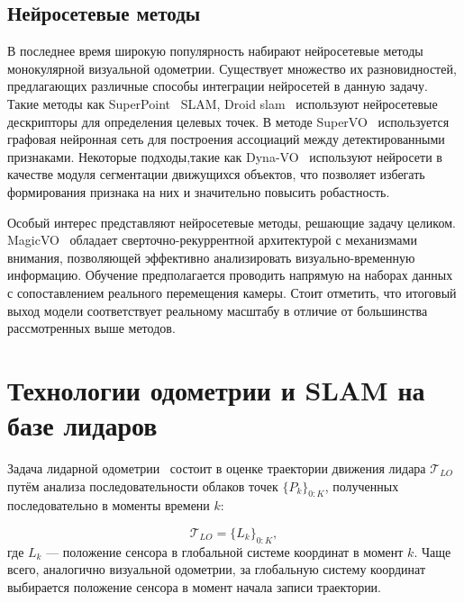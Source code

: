 \subsection{Нейросетевые методы}
В последнее время широкую популярность набирают нейросетевые методы монокулярной
визуальной одометрии. Существует множество их разновидностей, предлагающих различные
способы интеграции нейросетей в данную задачу. Такие методы как SuperPoint~\cite{detone2018superpoint} SLAM, Droid slam~\cite{teed2021droid}
используют нейросетевые дескрипторы для определения целевых точек. В методе SuperVO~\cite{rao2021supervo} используется
графовая нейронная сеть для построения ассоциаций между детектированными признаками. 
Некоторые подходы,такие как Dyna-VO~\cite{ma2021dyna} используют нейросети в качестве модуля сегментации
движущихся объектов, что позволяет избегать формирования признака на них и значительно 
повысить робастность.

Особый интерес представляют нейросетевые методы, решающие задачу целиком. MagicVO~\cite{jiao2019magicvo} обладает
сверточно-рекуррентной архитектурой с механизмами внимания, позволяющей эффективно 
анализировать визуально-временную информацию. Обучение предполагается проводить напрямую
на наборах данных с сопоставлением реального перемещения камеры. Стоит отметить, что
итоговый выход модели соответствует реальному масштабу в отличие от большинства рассмотренных
выше методов. 

\section{Технологии одометрии и SLAM на базе лидаров}

Задача лидарной одометрии~\cite{lee2024lidar} состоит в оценке траектории движения лидара 
$\mathcal{T}_{LO}$ путём анализа последовательности облаков точек 
$\{{P}_k\}_{0:K}$, полученных последовательно в моменты времени $k$:

\begin{equation}
    \mathcal{T}_{LO} = \{ L_k \}_{0:K},
\end{equation}
где $L_k$ --- положение сенсора в глобальной системе координат в момент $k$. Чаще 
всего, аналогично визуальной одометрии, за глобальную систему координат выбирается положение сенсора в 
момент начала записи траектории.

